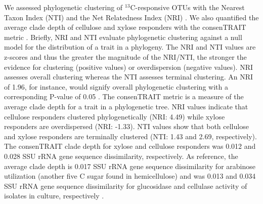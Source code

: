We assessed phylogenetic clustering of $^{13}$C-responsive OTUs with the
Nearest Taxon Index (NTI) and the Net Relatedness Index (NRI)
\citep{Webb2000}. We also quantified the average clade depth of cellulose
and xylose responders with the consenTRAIT metric \citep{Martiny2013}. 
Briefly, NRI and NTI evaluate phylogenetic clustering against a null model for
the distribution of a trait in a phylogeny. The NRI and NTI values are
z-scores and thus the greater the magnitude of the NRI/NTI, the stronger
the evidence for clustering (positive values) or overdispersion (negative
values). NRI assesses overall clustering whereas the NTI assesses terminal
clustering. An NRI of 1.96, for instance, would signify overall
phylogenetic clustering with a corresponding P-value of 0.05
\citep{Evans2014a}. The consenTRAIT metric is a measure of the average
clade depth for a trait in a phylogenetic tree. NRI values indicate that
cellulose responders clustered phylogenetically (NRI: 4.49) while xylose
responders are overdispersed (NRI: -1.33). NTI values show that both
cellulose and xylose responders are terminally clustered (NTI: 1.43 and
2.69, respectively). The consenTRAIT clade depth for xylose and cellulose
responders was 0.012 and 0.028 SSU rRNA gene sequence dissimilarity,
respectively. As reference, the average clade depth is 0.017 SSU rRNA gene
sequence dissimilarity for arabinose utilization (another five C sugar
found in hemicellulose) and was 0.013 and 0.034 SSU rRNA gene sequence
dissimilarity for glucosidase and cellulase activity of isolates in
culture, respectively \citep{Martiny2013,Berlemont2013}.
